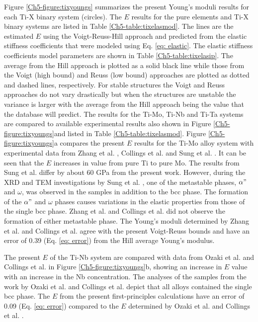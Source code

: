 Figure \ref{Ch5-figure:tixyoungs} summarizes the present Young's moduli results for each Ti-X binary system (circles). The $E$ results for the pure elements and Ti-X binary systems are listed in Table \ref{Ch5-table:tixelasmod}. The lines are the estimated $E$ using the Voigt-Reuss-Hill approach and predicted from the elastic stiffness coefficients that were modeled using Eq. \ref{eq: elastic}. The elastic stiffness coefficients model parameters are shown in Table \ref{Ch5-table:tixelasip}. The average from the Hill approach is plotted as a solid black line while those from the Voigt (high bound) and Reuss (low bound) approaches are plotted as dotted and dashed lines, respectively. For stable structures the Voigt and Reuss approaches do not vary drastically but when the structures are unstable the variance is larger with the average from the Hill approach being the value that the database will predict. The results for the Ti-Mo, Ti-Nb and Ti-Ta systems are compared to available experimental results \cite{Zhang2015,Boyer1994,Sung2015,Ozaki2004,Fedotov1985,Zhou2009a,Zhou2004a} also shown in Figure \ref{Ch5-figure:tixyoungs}and listed in Table \ref{Ch5-table:tixelasmod}. Figure \ref{Ch5-figure:tixyoungs}a compares the present $E$ results for the Ti-Mo alloy system with experimental data from Zhang et al. \cite{Zhang2015}, Collings et al. \cite{Boyer1994} and Sung et al. \cite{Sung2015}. It can be seen that the $E$ increases in value from pure Ti to pure Mo. The results from Sung et al. \cite{Sung2015} differ by about 60 GPa from the present work. However, during the XRD and TEM investigations by Sung et al. \cite{Sung2015}, one of the metastable phases, $\alpha"$ and $\omega$, was observed in the samples in addition to the bcc phase. The formation of the $\alpha"$ and $\omega$ phases causes variations in the elastic properties from those of the single bcc phase. Zhang et al. \cite{Zhang2015} and Collings et al. \cite{Boyer1994} did not observe the formation of either metastable phase. The Young's moduli determined by Zhang et al. \cite{Zhang2015} and Collings et al. \cite{Boyer1994} agree with the present Voigt-Reuss bounds and have an error of 0.39 (Eq. \ref{eq: error}) from the Hill average Young's modulus. 

The present $E$ of the Ti-Nb system are compared with data from Ozaki et al. \cite{Ozaki2004} and Collings et al. \cite{Boyer1994} in Figure \ref{Ch5-figure:tixyoungs}b, showing an increase in $E$ value with an increase in the Nb concentration. The analyses of the samples from the work by Ozaki et al. \cite{Ozaki2004} and Collings et al. \cite{Boyer1994} depict that all alloys contained the single bcc phase. The $E$ from the present first-principles calculations have an error of 0.09 (Eq. \ref{eq: error}) compared to the $E$ determined by Ozaki et al. \cite{Ozaki2004} and Collings et al. \cite{Boyer1994}. 

